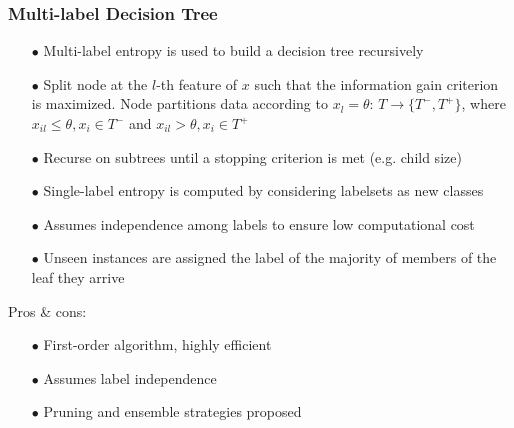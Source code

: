 \documentclass{beamer}
\begin{document}
\begin{frame}
\frametitle{Multi-label Decision Tree}
\begin{itemize}
\item[$\bullet$] Multi-label entropy is used to build a decision tree recursively
\item[$\bullet$] Split node at the $l$-th feature of $x$ such that the information gain
  criterion is maximized. Node partitions data according to $x_l = \theta$:
 $T \rightarrow \{T^-,T^+\}$, where $ x_{il} \leq \theta, x_i \in T^-$ and $ x_{il} > \theta, x_i \in T^+$
\item[$\bullet$] Recurse on subtrees until a stopping criterion is met (e.g. child size)
\item[$\bullet$] Single-label entropy is computed by considering labelsets as new classes
\item[$\bullet$] Assumes independence among labels to ensure low computational cost
\item[$\bullet$] Unseen instances are assigned the label of the majority of members of the leaf they arrive
\end{itemize}
Pros \& cons:
\begin{itemize}
\item[$\bullet$] First-order algorithm, highly efficient
\item[$\bullet$] Assumes label independence
\item[$\bullet$] Pruning and ensemble strategies proposed
\end{itemize}
\end{frame}
\end{document}
